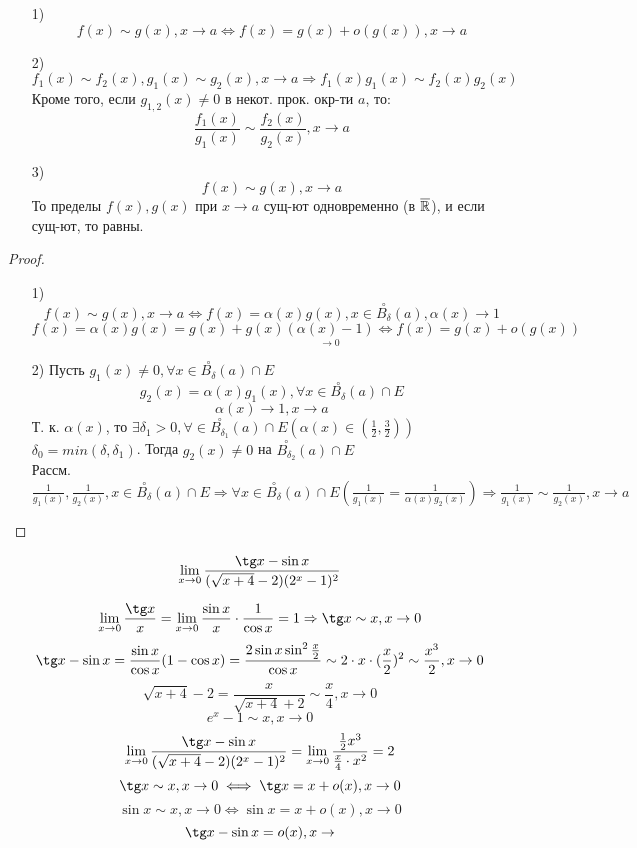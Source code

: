 \begin{lemma}
\begin{itemize}
  \item [1) ] \[
  f(x) \sim g(x), x \rightarrow a \iff f(x) = g(x) + o(g(x)), x \rightarrow a
  \]
\item [2) ] \[
  f_1(x) \sim f_2(x), g_1(x) \sim g_2(x), x\rightarrow a \Rightarrow f_1(x)g_1(x) \sim f_2(x)g_2(x)
\]
Кроме того, если $g_{1, 2}(x) \neq 0$ в некот. прок. окр-ти $a$, то:
\[
  \frac{f_1(x)}{g_1(x)} \sim \frac{f_2(x)}{g_2(x)}, x \rightarrow a
\]
\item [3) ] \[
    f(x) \sim g(x), x \rightarrow a
\]
То пределы $f(x), g(x)$ при $x \rightarrow a$ сущ-ют одновременно (в $\overline{\mathbb{R}}$), и если сущ-ют, то равны.
\end{itemize}
\end{lemma}
\begin{proof}
\begin{itemize}
  \item [1) ] \[
  f(x) \sim g(x), x \rightarrow a \iff f(x) = \alpha(x) g(x), x \in \overset{\circ}{B_{\delta}}(a), \alpha(x) \rightarrow 1
  \]
  \[
  f(x) = \alpha(x) g(x) =  g(x) + g(x)\underset{\rightarrow 0}{(\alpha(x) - 1)} \iff f(x) = g(x) + o(g(x))
  \]
\item [2) ] Пусть $g_1(x) \neq 0, \forall x \in \overset{\circ}{B_{\delta}}(a) \cap E$
  \[
  g_2(x) = \alpha(x) g_1(x), \forall x \in \overset{\circ}{B_{\delta}}(a) \cap E
  \]
  \[
  \alpha(x) \rightarrow 1, x \rightarrow a
  \]
  Т. к. $\alpha(x)$, то $\exists \delta_1 > 0, \forall \in \overset{\circ}{B_{\delta_1}}(a) \cap E (\alpha(x) \in (\frac{1}{2}, \frac{3}{2}))$ \\
  $\delta_0 = min(\delta, \delta_1)$. Тогда $g_2(x) \neq 0$ на $\overset{\circ}{B_{\delta_2}}(a) \cap E$ \\
  Рассм. $\frac{1}{g_1(x)}, \frac{1}{g_2(x)}, x \in \overset{\circ}{B_{\delta}}(a) \cap E \Rightarrow \forall x\in \overset{\circ}{B_{\delta}}(a) \cap E (\frac{1}{g_1(x)} = \frac{1}{\alpha(x)g_2(x)}) \Rightarrow \frac{1}{g_1(x)} \sim \frac{1}{g_2(x)}, x \rightarrow a$
\end{itemize}
\end{proof}
\begin{example}
\[
  \lim_{x\to 0} \frac{\tg x - \sin x}{(\sqrt {x + 4} - 2)(2^{x} - 1)^{2}}
\]
\end{example}
\begin{solution}
\[
\lim_{x\to 0} \frac{\tg x}{x} = \lim_{x\to 0} \frac{\sin x}{x} \cdot \frac{1}{\cos x} = 1 \Rightarrow \tg x \sim x, x \rightarrow 0
\]
\[
\tg x - \sin x = \frac{\sin x}{\cos x}(1 - \cos x) = \frac{2\sin x \sin^{2}\frac{x}{2}}{\cos x} \sim 2 \cdot x \cdot (\frac{x}{2})^{2} \sim \frac{x^{3}}{2}, x \rightarrow 0
\]
\[
  \sqrt{x + 4} - 2 = \frac{x}{\sqrt{x + 4} + 2} \sim \frac{x}{4}, x \rightarrow 0
\]
\[
  e^{x} - 1 \sim x, x \rightarrow 0
\]
\[
  \lim_{x\to 0} \frac{\tg x - \sin x}{(\sqrt {x + 4} - 2)(2^{x} - 1)^{2}} = \lim_{x\to 0} \frac{\frac{1}{2}x^{3}}{\frac{x}{4} \cdot x^{2}} = 2
\]
\[
\tg x \sim x, x \rightarrow 0 \iff \tg x = x + o(x), x \rightarrow 0
\]
\[
\sin x \sim x, x \rightarrow 0 \iff \sin x = x + o(x), x \rightarrow 0
\]
\[
\tg x - \sin x = o(x), x \rightarrow
\]
\end{solution}
